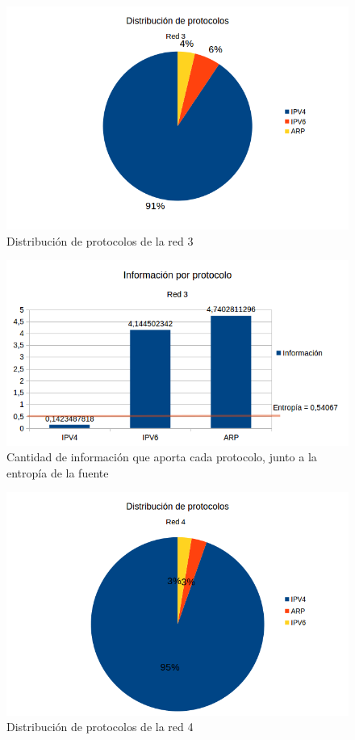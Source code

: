 \begin{figure}[H]
	\centering
	\includegraphics[scale=0.65]{imgs/red3_capturar.png}
	\caption{Distribución de protocolos de la red 3}
      \label{red3_capturar}
\end{figure}

\begin{figure}[H]
	\centering
	\includegraphics[scale=0.65]{imgs/red3_capturar_entropia.png}
	\caption{Cantidad de información que aporta cada protocolo, junto a la entropía de la fuente}
      \label{red3_capturar_entropia}
\end{figure}

\begin{figure}[H]
	\centering
	\includegraphics[scale=0.65]{imgs/red4_capturar.png}
	\caption{Distribución de protocolos de la red 4}
      \label{red4_capturar}
\end{figure}

